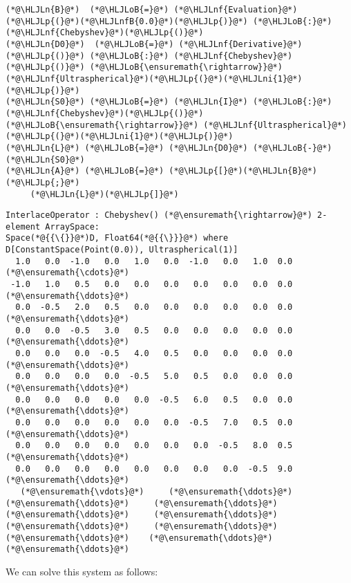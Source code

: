 \documentclass[12pt,landscape]{article}
\newcommand{\HLJLn}[1]{#1}
\newcommand{\HLJLnf}[1]{\textcolor[RGB]{66,102,213}{#1}}
\newcommand{\HLJLnfB}[1]{\textcolor[RGB]{59,151,46}{#1}}
\newcommand{\HLJLni}[1]{\textcolor[RGB]{59,151,46}{#1}}
\newcommand{\HLJLoB}[1]{\textcolor[RGB]{102,102,102}{\textbf{#1}}}
\newcommand{\HLJLp}[1]{#1}
\begin{document}
{\begin{lstlisting}
(*@\HLJLn{B}@*)  (*@\HLJLoB{=}@*) (*@\HLJLnf{Evaluation}@*)(*@\HLJLp{(}@*)(*@\HLJLnfB{0.0}@*)(*@\HLJLp{)}@*) (*@\HLJLoB{:}@*) (*@\HLJLnf{Chebyshev}@*)(*@\HLJLp{()}@*)
(*@\HLJLn{D0}@*)  (*@\HLJLoB{=}@*) (*@\HLJLnf{Derivative}@*)(*@\HLJLp{()}@*) (*@\HLJLoB{:}@*) (*@\HLJLnf{Chebyshev}@*)(*@\HLJLp{()}@*) (*@\HLJLoB{\ensuremath{\rightarrow}}@*) (*@\HLJLnf{Ultraspherical}@*)(*@\HLJLp{(}@*)(*@\HLJLni{1}@*)(*@\HLJLp{)}@*)
(*@\HLJLn{S0}@*) (*@\HLJLoB{=}@*) (*@\HLJLn{I}@*) (*@\HLJLoB{:}@*) (*@\HLJLnf{Chebyshev}@*)(*@\HLJLp{()}@*) (*@\HLJLoB{\ensuremath{\rightarrow}}@*) (*@\HLJLnf{Ultraspherical}@*)(*@\HLJLp{(}@*)(*@\HLJLni{1}@*)(*@\HLJLp{)}@*)
(*@\HLJLn{L}@*) (*@\HLJLoB{=}@*) (*@\HLJLn{D0}@*) (*@\HLJLoB{-}@*) (*@\HLJLn{S0}@*)
(*@\HLJLn{A}@*) (*@\HLJLoB{=}@*) (*@\HLJLp{[}@*)(*@\HLJLn{B}@*)(*@\HLJLp{;}@*)
     (*@\HLJLn{L}@*)(*@\HLJLp{]}@*)
\end{lstlisting}

\begin{lstlisting}
InterlaceOperator : Chebyshev() (*@\ensuremath{\rightarrow}@*) 2-element ArraySpace:
Space(*@{{\{}}@*)D, Float64(*@{{\}}}@*) where D[ConstantSpace(Point(0.0)), Ultraspherical(1)]
  1.0   0.0  -1.0   0.0   1.0   0.0  -1.0   0.0   1.0  0.0  (*@\ensuremath{\cdots}@*)
 -1.0   1.0   0.5   0.0   0.0   0.0   0.0   0.0   0.0  0.0  (*@\ensuremath{\ddots}@*)
  0.0  -0.5   2.0   0.5   0.0   0.0   0.0   0.0   0.0  0.0  (*@\ensuremath{\ddots}@*)
  0.0   0.0  -0.5   3.0   0.5   0.0   0.0   0.0   0.0  0.0  (*@\ensuremath{\ddots}@*)
  0.0   0.0   0.0  -0.5   4.0   0.5   0.0   0.0   0.0  0.0  (*@\ensuremath{\ddots}@*)
  0.0   0.0   0.0   0.0  -0.5   5.0   0.5   0.0   0.0  0.0  (*@\ensuremath{\ddots}@*)
  0.0   0.0   0.0   0.0   0.0  -0.5   6.0   0.5   0.0  0.0  (*@\ensuremath{\ddots}@*)
  0.0   0.0   0.0   0.0   0.0   0.0  -0.5   7.0   0.5  0.0  (*@\ensuremath{\ddots}@*)
  0.0   0.0   0.0   0.0   0.0   0.0   0.0  -0.5   8.0  0.5  (*@\ensuremath{\ddots}@*)
  0.0   0.0   0.0   0.0   0.0   0.0   0.0   0.0  -0.5  9.0  (*@\ensuremath{\ddots}@*)
   (*@\ensuremath{\vdots}@*)     (*@\ensuremath{\ddots}@*)     (*@\ensuremath{\ddots}@*)     (*@\ensuremath{\ddots}@*)     (*@\ensuremath{\ddots}@*)     (*@\ensuremath{\ddots}@*)     (*@\ensuremath{\ddots}@*)     (*@\ensuremath{\ddots}@*)     (*@\ensuremath{\ddots}@*)    (*@\ensuremath{\ddots}@*)   (*@\ensuremath{\ddots}@*)
\end{lstlisting}


We can solve this system as follows:


}
\end{document}
